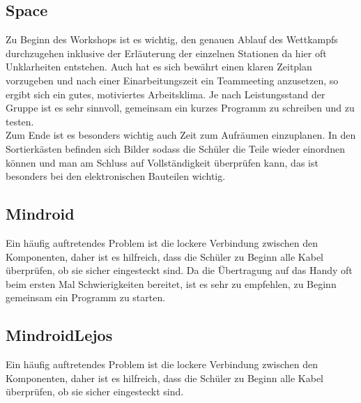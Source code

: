 \documentclass[
	ngerman,
	accentcolor=1c,%
	]{tudapub}
\begin{document}
\subsection{Space}
Zu Beginn des Workshops ist es wichtig, den genauen Ablauf des Wettkampfs durchzugehen inklusive der Erl\"auterung der einzelnen Stationen da hier oft Unklarheiten entstehen.\newline
Auch hat es sich bew\"ahrt einen klaren Zeitplan vorzugeben und nach einer Einarbeitungszeit ein Teammeeting anzusetzen, so ergibt sich ein gutes, motiviertes Arbeitsklima.\newline
Je nach Leistungsstand der Gruppe ist es sehr sinnvoll, gemeinsam ein kurzes Programm zu schreiben und zu testen.
\\Zum Ende ist es besonders wichtig auch Zeit zum Aufr\"aumen einzuplanen. In den Sortierk\"asten befinden sich Bilder sodass die Sch\"uler die Teile wieder einordnen k\"onnen und man am Schluss auf Vollst\"andigkeit \"uberpr\"ufen kann, das ist besonders bei den elektronischen Bauteilen wichtig.

\subsection{Mindroid}
Ein h\"aufig auftretendes Problem ist die lockere Verbindung zwischen den Komponenten, daher ist es hilfreich, dass die Sch\"uler zu Beginn alle Kabel \"uberpr\"ufen, ob sie sicher eingesteckt sind.\newline
Da die \"Ubertragung auf das Handy oft beim ersten Mal Schwierigkeiten bereitet, ist es sehr zu empfehlen, zu Beginn gemeinsam ein Programm zu starten.\\


\subsection{MindroidLejos}
Ein h\"aufig auftretendes Problem ist die lockere Verbindung zwischen den Komponenten, daher ist es hilfreich, dass die Sch\"uler zu Beginn alle Kabel \"uberpr\"ufen, ob sie sicher eingesteckt sind.\newline




\cfoot{\textcolor{lightgray} \today}
\end{document}
